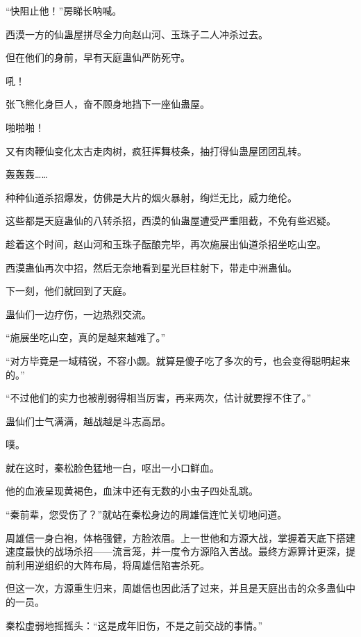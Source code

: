 
\begin{this_body}



“快阻止他！”房睇长呐喊。

西漠一方的仙蛊屋拼尽全力向赵山河、玉珠子二人冲杀过去。

但在他们的身前，早有天庭蛊仙严防死守。

吼！

张飞熊化身巨人，奋不顾身地挡下一座仙蛊屋。

啪啪啪！

又有肉鞭仙变化太古走肉树，疯狂挥舞枝条，抽打得仙蛊屋团团乱转。

轰轰轰……

种种仙道杀招爆发，仿佛是大片的烟火暴射，绚烂无比，威力绝伦。

这些都是天庭蛊仙的八转杀招，西漠的仙蛊屋遭受严重阻截，不免有些迟疑。

趁着这个时间，赵山河和玉珠子酝酿完毕，再次施展出仙道杀招坐吃山空。

西漠蛊仙再次中招，然后无奈地看到星光巨柱射下，带走中洲蛊仙。

下一刻，他们就回到了天庭。

蛊仙们一边疗伤，一边热烈交流。

“施展坐吃山空，真的是越来越难了。”

“对方毕竟是一域精锐，不容小觑。就算是傻子吃了多次的亏，也会变得聪明起来的。”

“不过他们的实力也被削弱得相当厉害，再来两次，估计就要撑不住了。”

蛊仙们士气满满，越战越是斗志高昂。

噗。

就在这时，秦松脸色猛地一白，呕出一小口鲜血。

他的血液呈现黄褐色，血沫中还有无数的小虫子四处乱跳。

“秦前辈，您受伤了？”就站在秦松身边的周雄信连忙关切地问道。

周雄信一身白袍，体格强健，方脸浓眉。上一世他和方源大战，掌握着天底下搭建速度最快的战场杀招——流言笼，并一度令方源陷入苦战。最终方源算计更深，提前利用逆组织的大阵布局，将周雄信陷害杀死。

但这一次，方源重生归来，周雄信也因此活了过来，并且是天庭出击的众多蛊仙中的一员。

秦松虚弱地摇摇头：“这是成年旧伤，不是之前交战的事情。”


\end{this_body}
